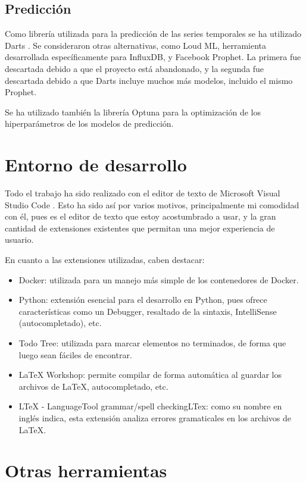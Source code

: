 \subsection{Predicción}

Como librería utilizada para la predicción de las series temporales se ha utilizado Darts \cite{JMLR:v23:21-1177}.
Se consideraron otras alternativas, como Loud ML, herramienta desarrollada específicamente para InfluxDB, y 
Facebook Prophet. La primera fue descartada debido a que el proyecto está abandonado, y la segunda fue descartada 
debido a que Darts incluye muchos más modelos, incluido el mismo Prophet.

Se ha utilizado también la librería Optuna\cite{optuna} para la optimización de los hiperparámetros de los modelos de predicción.

\section{Entorno de desarrollo}

Todo el trabajo ha sido realizado con el editor de texto de Microsoft Visual Studio Code \cite{visualstudiocode}. Esto ha sido así por 
varios motivos, principalmente mi comodidad con él, pues es el editor de texto que estoy acostumbrado a usar, y 
la gran cantidad de extensiones existentes que permitan una mejor experiencia de usuario.

En cuanto a las extensiones utilizadas, caben destacar:
\begin{itemize}
    \item Docker: utilizada para un manejo más simple de los contenedores de Docker.
    \item Python: extensión esencial para el desarrollo en Python, pues ofrece características como un Debugger, 
        resaltado de la sintaxis, IntelliSense (autocompletado), etc.
    \item Todo Tree: utilizada para marcar elementos no terminados, de forma que luego sean fáciles de encontrar.
    \item LaTeX Workshop: permite compilar de forma automática al guardar los archivos de LaTeX, autocompletado, etc.
    \item LTeX - LanguageTool grammar/spell checkingLTex: como su nombre en inglés indica, esta extensión analiza 
        errores gramaticales en los archivos de LaTeX.
\end{itemize}


\section{Otras herramientas}


